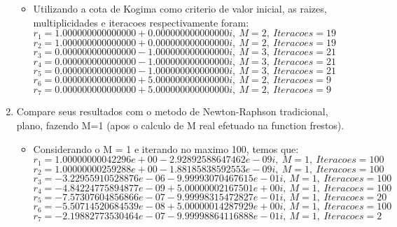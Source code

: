 \documentclass[fleqn]{article}
\begin{document}
\begin{enumerate}
\begin{itemize}
        \item Utilizando a cota de Kogima como criterio de valor         inicial, as raizes, multiplicidades e iteracoes respectivamente       foram:\\
        $r_{1} = 1.000000000000000 + 0.000000000000000i,\ M = 2, \                Iteracoes = 19$\\
        $r_{2} = 1.000000000000000 + 0.000000000000000i,\ M = 2, \              Iteracoes = 19$\\
        $r_{3} = 0.000000000000000 - 1.000000000000000i,\ M = 3, \               Iteracoes = 21$\\
        $r_{4} = 0.000000000000000 - 1.000000000000000i,\ M = 3, \               Iteracoes = 21$\\
        $r_{5} = 0.000000000000000 - 1.000000000000000i,\ M = 3, \              Iteracoes = 21$\\
        $r_{6} = 0.000000000000000 + 5.000000000000000i,\ M = 2, \              Iteracoes = 9$\\
        $r_{7} = 0.000000000000000 + 5.000000000000000i,\ M = 2, \              Iteracoes = 9$\\
   \end{itemize}
   \item Compare seus resultados com o metodo de Newton-Raphson         tradicional, plano, fazendo M=1 (apos o calculo de M real efetuado    na function frestos).
   \begin{itemize}
    \item Considerando o M = 1 e iterando no maximo 100, temos que:\\
        $r_{1} = 1.00000000042296e+00 - 2.92892588647462e-09i,\ M = 1, \                Iteracoes = 100$\\
        $r_{2} = 1.00000000259288e+00 - 1.88185838592553e-09i,\ M = 1, \              Iteracoes = 100$\\
        $r_{3} = -3.22955910528876e-06 - 9.99993070467615e-01i,\ M = 1, \               Iteracoes = 100$\\
        $r_{4} = -4.84224775894877e-09 + 5.00000002167501e+00i,\ M = 1, \               Iteracoes = 100$\\
        $r_{5} =-7.57307604856866e-07 - 9.99998315472827e-01i,\ M = 1, \              Iteracoes = 20$\\
        $r_{6} = -5.50714520684539e-08 + 5.00000014287929e+00i,\ M = 1, \              Iteracoes = 100$\\
        $r_{7} = -2.19882773530464e-07 - 9.99998864116888e-01i,\ M = 1, \              Iteracoes = 2$\\

\end{itemize}
\end{enumerate}
\end{document}
